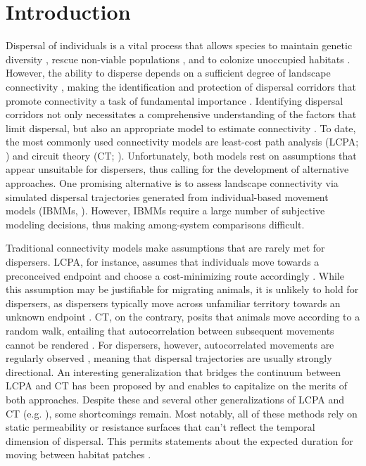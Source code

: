 \documentclass[../FinalThesis.tex]{subfiles}
\begin{document}
\newpage
\section{Introduction}

Dispersal of individuals is a vital process that allows species to maintain
genetic diversity \citep{Perrin.2000, Frankham.2002, Leigh.2012, Baguette.2013,
LaPoint.2013}, rescue non-viable populations \citep{Brown.1977}, and to colonize
unoccupied habitats \citep{Hanski.1999a, MacArthur.2001}. However, the ability
to disperse depends on a sufficient degree of landscape connectivity
\citep{Fahrig.2003, Clobert.2012}, making the identification and protection of
dispersal corridors that promote connectivity a task of fundamental importance
\citep{Doerr.2011, Rudnick.2012}. Identifying dispersal corridors not only
necessitates a comprehensive understanding of the factors that limit dispersal,
but also an appropriate model to estimate connectivity \citep{Baguette.2013,
Vasudev.2015, Hofmann.2021}. To date, the most commonly used connectivity models
are least-cost path analysis (LCPA; \citealp{Adriaensen.2003}) and circuit
theory (CT; \citealp{McRae.2006, McRae.2008}). Unfortunately, both models rest
on assumptions that appear unsuitable for dispersers, thus calling for the
development of alternative approaches. One promising alternative is to assess
landscape connectivity via simulated dispersal trajectories generated from
individual-based movement models (IBMMs, \citealp{Diniz.2019}). However, IBMMs
require a large number of subjective modeling decisions, thus making
among-system comparisons difficult.

Traditional connectivity models make assumptions that are rarely met for
dispersers. LCPA, for instance, assumes that individuals move towards a
preconceived endpoint and choose a cost-minimizing route accordingly
\citep{Sawyer.2011, Abrahms.2017}. While this assumption may be justifiable for
migrating animals, it is unlikely to hold for dispersers, as dispersers
typically move across unfamiliar territory towards an unknown endpoint
\citep{Koen.2014, Cozzi.2020}. CT, on the contrary, posits that animals move
according to a random walk, entailing that autocorrelation between subsequent
movements cannot be rendered \citep{Diniz.2019}. For dispersers, however,
autocorrelated movements are regularly observed \citep{Cozzi.2020,
Hofmann.2021}, meaning that dispersal trajectories are usually strongly
directional. An interesting generalization that bridges the continuum between
LCPA and CT has been proposed by \citet{Panzacchi.2016} and enables to
capitalize on the merits of both approaches. Despite these and several other
generalizations of LCPA and CT (e.g. \citealp{Pinto.2009, Landguth.2012,
Panzacchi.2016, Brennan.2020}), some shortcomings remain. Most notably, all of
these methods rely on static permeability or resistance surfaces that can't
reflect the temporal dimension of dispersal. This permits statements about the
expected duration for moving between habitat patches \citep{Martensen.2017,
Diniz.2019}.
\end{document}

